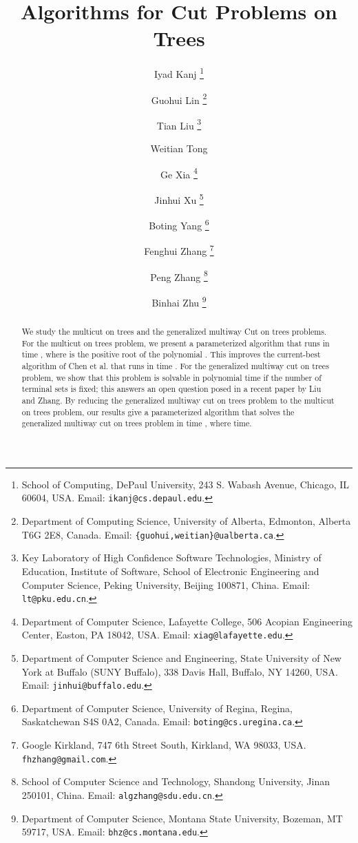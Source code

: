 \documentclass[11pt]{article}
\begin{document}
\title{Algorithms for Cut Problems on Trees}

\author{
  Iyad Kanj
    \thanks{School of  Computing, DePaul University,
        243 S. Wabash Avenue, Chicago, IL 60604, USA.
        Email: \texttt{ikanj@cs.depaul.edu}.}
  \and
  Guohui Lin
    \thanks{Department of Computing Science, University of Alberta,
        Edmonton, Alberta T6G 2E8, Canada.
        Email: \texttt{\{guohui,weitian\}@ualberta.ca}.}
  \and
  Tian Liu
    \thanks{Key Laboratory of High Confidence Software Technologies, Ministry of Education,
        Institute of Software, School of Electronic Engineering and Computer Science,
        Peking University, Beijing 100871, China.
        Email: \texttt{lt@pku.edu.cn}.}
  \and
  Weitian Tong
  \footnotemark[2]
  \and
  Ge Xia
    \thanks{Department of Computer Science, Lafayette College,
        506 Acopian Engineering Center, Easton, PA 18042, USA.
        Email: \texttt{xiag@lafayette.edu}.}
  \and
  Jinhui Xu
    \thanks{Department of Computer Science and Engineering,
        State University of New York at Buffalo (SUNY Buffalo),
        338 Davis Hall, Buffalo, NY 14260, USA.
        Email: \texttt{jinhui@buffalo.edu}.}
  \and
  Boting Yang
    \thanks{Department of Computer Science, University of Regina,
        Regina, Saskatchewan S4S 0A2, Canada.
        Email: \texttt{boting@cs.uregina.ca}.}
   \and
  Fenghui Zhang
    \thanks{Google
	Kirkland, 747 6th Street South,
	Kirkland, WA 98033, USA.
	\texttt{fhzhang@gmail.com}.}
  \and
  Peng Zhang
    \thanks{School of Computer Science and Technology, Shandong University,
        Jinan 250101, China.
        Email: \texttt{algzhang@sdu.edu.cn}.}
  \and
  Binhai Zhu
    \thanks{Department of Computer Science, Montana State University,
        Bozeman, MT 59717, USA.
        Email: \texttt{bhz@cs.montana.edu}.}
}
\date{}
\maketitle

\begin{abstract}
We study the {\sc multicut on trees} and the {\sc generalized multiway Cut on trees} problems. For the {\sc multicut on trees} problem, we present a parameterized algorithm that runs in time
, where  is the positive root of the polynomial .
This improves the current-best algorithm of Chen et al. that runs in time . For the {\sc generalized multiway cut on trees} problem, we show that this problem is solvable in polynomial time if the number of terminal sets is fixed; this answers an open question posed in a recent paper by Liu and Zhang. By reducing the {\sc generalized multiway cut on trees} problem to the {\sc multicut on trees} problem, our results give a parameterized algorithm that solves the {\sc generalized multiway cut on trees} problem in time , where  time.
\end{abstract}
\end{document}
